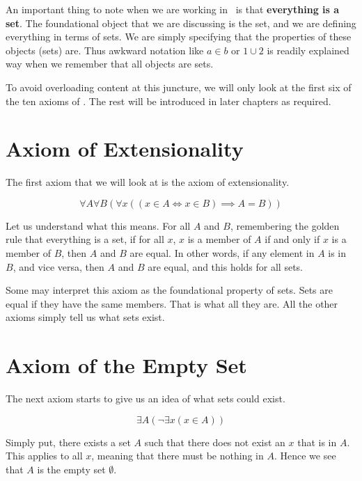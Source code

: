 An important thing to note when we are working in \ZFC~is that \textbf{everything is a set}. The foundational object that we are discussing is the set, and we are defining everything in terms of sets. We are simply specifying that the properties of these objects (sets) are. Thus awkward notation like $a \in b$ or $1 \cup 2$ is readily explained way when we remember that all objects are sets.

To avoid overloading content at this juncture, we will only look at the first six of the ten axioms of \ZFC. The rest will be introduced in later chapters as required.

\section{Axiom of Extensionality}
The first axiom that we will look at is the axiom of extensionality.

\begin{axiom}[Extensionality]\label{axiom:extensionality}
    \[
        \forall A \forall B \left(\forall x \left((x \in A \iff x \in B) \implies A = B\right)\right)
    \]
\end{axiom}

Let us understand what this means. For all $A$ and $B$, remembering the golden rule that everything is a set, if for all $x$, $x$ is a member of $A$ if and only if $x$ is a member of $B$, then $A$ and $B$ are equal. In other words, if any element in $A$ is in $B$, and vice versa, then $A$ and $B$ are equal, and this holds for all sets.

Some may interpret this axiom as the foundational property of sets. Sets are equal if they have the same members. That is what all they are. All the other axioms simply tell us what sets exist.

\section{Axiom of the Empty Set}
The next axiom starts to give us an idea of what sets could exist.

\begin{axiom}\label{axiom:empty-set}
    \[
        \exists A (\lnot \exists x (x \in A))
    \]
\end{axiom}

Simply put, there exists a set $A$ such that there does not exist an $x$ that is in $A$. This applies to all $x$, meaning that there must be nothing in $A$. Hence we see that $A$ is the empty set $\emptyset$.

